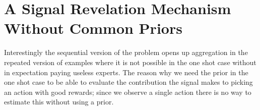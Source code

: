 










\section{A Signal Revelation Mechanism Without Common Priors}

Interestingly the sequential version of the problem opens up aggregation in the repeated version of examples where it is not possible in the one shot case without in expectation paying useless experts. 
The reason why we need the prior in the one shot case to be able to evaluate the contribution the signal makes to picking an action with good rewards; since we observe a single action there is no way to estimate this without using a prior. 

